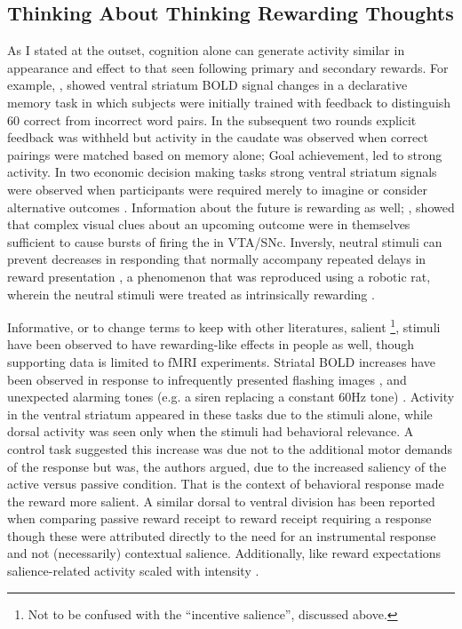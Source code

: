 \documentclass[doc,12pt]{apa}        %
\begin{document}
\subsection{Thinking About Thinking Rewarding Thoughts}
\label{sub:cog_rew}
As I stated at the outset, cognition alone can generate activity similar in appearance and effect to that seen following primary and secondary rewards.  For example, , showed ventral striatum BOLD signal changes in a declarative memory task in which subjects were initially trained with feedback to distinguish 60 correct from incorrect word pairs.  In the subsequent two rounds explicit feedback was withheld but activity in the caudate was observed when correct pairings were matched based on memory alone; Goal achievement, led to strong activity.  In two economic decision making tasks strong ventral striatum signals were observed when participants were required merely to imagine or consider alternative outcomes  \cite{Hayden:2009p6545, Lohrenz:2007p7240}.  Information about the future is rewarding as well; , showed that complex visual clues about an upcoming outcome were in themselves sufficient to cause bursts of firing the in VTA/SNc.  Inversly, neutral stimuli can prevent decreases in responding that normally accompany repeated delays in reward presentation \cite{Reed:1992p9094}, a phenomenon that was reproduced using a robotic rat, wherein the neutral stimuli were treated as intrinsically rewarding \cite{Fiore:2008p7249}.

Informative, or to change terms to keep with other literatures, salient
\footnote{
    Not to be confused with the ``incentive salience'', discussed above.
}, stimuli have been observed to have rewarding-like effects in people as well, though supporting data is limited to fMRI experiments.  Striatal BOLD increases have been observed in response to infrequently presented flashing images \cite{Zink:2003p5107}, and unexpected alarming tones (e.g. a siren replacing a constant 60Hz tone) \cite{Zink:2006p7210}.  Activity in the ventral striatum appeared in these tasks due to the stimuli alone, while dorsal activity was seen only when the stimuli had behavioral relevance.  A control task suggested this increase was due not to the additional motor demands of the response but was, the authors argued, due to the increased saliency of the active versus passive condition.  That is the context of behavioral response made the reward more salient.  A similar dorsal to ventral division has been reported when comparing passive reward receipt to reward receipt requiring a response \cite{ODoherty:2006p2875} though these were attributed directly to the need for an instrumental response and not (necessarily) contextual salience.  Additionally, like reward expectations salience-related activity scaled with intensity \cite{Zink:2006p7210}.
\end{document}
